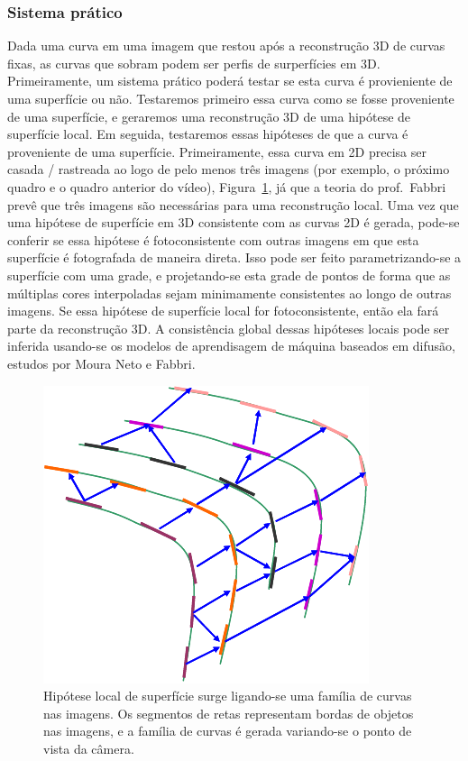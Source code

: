 \documentclass[a4paper,titlepage]{article}
\begin{document}
\subsubsection{Sistema prático}
Dada uma curva em uma imagem que restou após a reconstrução 3D de curvas fixas,
as curvas que sobram podem ser perfis de surperfícies em 3D. Primeiramente, um
sistema prático poderá testar se esta curva é provieniente de uma superfície ou
não.
Testaremos primeiro essa curva como se fosse proveniente de uma superfície, e
geraremos uma reconstrução 3D de uma hipótese de superfície local. Em seguida,
testaremos essas hipóteses de que a curva é proveniente de uma superfície.
Primeiramente, essa curva em 2D precisa ser casada / rastreada ao logo de pelo
menos três imagens (por exemplo, o próximo quadro e o quadro anterior do
vídeo), Figura~\ref{fig:vj}, já que a teoria do prof.\ Fabbri prevê que três imagens são necessárias
para uma reconstrução local. Uma vez que uma hipótese de superfície em 3D
consistente com as curvas 2D é gerada, pode-se conferir se essa hipótese é
fotoconsistente com outras imagens em que esta superfície é fotografada de
maneira direta. Isso pode ser feito parametrizando-se a superfície com uma
grade, e projetando-se esta grade de pontos de forma que as múltiplas cores
interpoladas sejam minimamente consistentes ao longo de outras imagens.
Se essa hipótese de superfície local for fotoconsistente, então ela fará parte
da reconstrução 3D. A consistência global dessas hipóteses locais pode ser
inferida usando-se os modelos de aprendisagem de máquina baseados em difusão,
estudos por Moura Neto e Fabbri. 
\begin{figure}
\centering
\includegraphics[scale=1]{figs/dynamic_curve_fragment-eps-converted-to.pdf}
\caption{
Hipótese local de superfície surge ligando-se uma família de curvas nas imagens.
Os segmentos de retas representam bordas de objetos nas imagens, e a família de
curvas é gerada variando-se o ponto de vista da câmera.
}
\label{fig:vj}
\end{figure}
\end{document}
